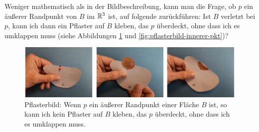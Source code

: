     
    
    
    Weniger
    mathematisch als in der Bildbeschreibung, kann man die Frage, ob $p$ ein äußerer Randpunkt von $B$ im $\mathbb{R}^3$ ist, auf folgende zurückführen:
    Ist $B$ verletzt bei $p$, kann ich dann ein Pflaster auf $B$ kleben, das $p$ überdeckt, ohne dass ich es umklappen muss (siehe Abbildungen \ref{fig:pflasterbild-aeusserer-rand} und \ref{fig:pflasterbild-innerer-pkt})?
    
    \begin{figure}[ht]
        \centering
        \includegraphics[width=\textwidth]{bearbeitet-22-04-25/pflasterbild-aeusserer-rand.png}
        \caption[Pflasterbild: äußerer Randpunkt]{Pflasterbild: Wenn $p$ ein äußerer Randpunkt einer Fläche $B$ ist, so kann ich kein Pflaster auf $B$ kleben, das $p$ überdeckt, ohne dass ich es umklappen muss.}
        \label{fig:pflasterbild-aeusserer-rand}
    \end{figure}
    
